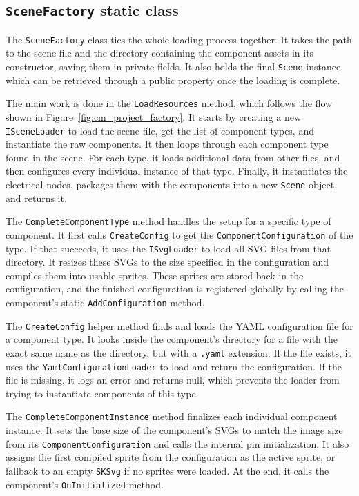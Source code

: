 \subsection{\texttt{SceneFactory} static class}

The \texttt{SceneFactory} class ties the whole loading process together. It takes the path to the scene file and the directory containing the component assets in its constructor, saving them in private fields. It also holds the final \texttt{Scene} instance, which can be retrieved through a public property once the loading is complete.

The main work is done in the \texttt{LoadResources} method, which follows the flow shown in Figure~\ref{fig:cm_project_factory}. It starts by creating a new \texttt{ISceneLoader} to load the scene file, get the list of component types, and instantiate the raw components. It then loops through each component type found in the scene. For each type, it loads additional data from other files, and then configures every individual instance of that type. Finally, it instantiates the electrical nodes, packages them with the components into a new \texttt{Scene} object, and returns it.

The \texttt{CompleteComponentType} method handles the setup for a specific type of component. It first calls \texttt{CreateConfig} to get the \texttt{ComponentConfiguration} of the type. If that succeeds, it uses the \texttt{ISvgLoader} to load all SVG files from that directory. It resizes these SVGs to the size specified in the configuration and compiles them into usable sprites. These sprites are stored back in the configuration, and the finished configuration is registered globally by calling the component's static \texttt{AddConfiguration} method.

The \texttt{CreateConfig} helper method finds and loads the YAML configuration file for a component type. It looks inside the component's directory for a file with the exact same name as the directory, but with a \texttt{.yaml} extension. If the file exists, it uses the \texttt{YamlConfigurationLoader} to load and return the configuration. If the file is missing, it logs an error and returns null, which prevents the loader from trying to instantiate components of this type.

The \texttt{CompleteComponentInstance} method finalizes each individual component instance. It sets the base size of the component's SVGs to match the image size from its \texttt{ComponentConfiguration} and calls the internal pin initialization. It also assigns the first compiled sprite from the configuration as the active sprite, or fallback to an empty \texttt{SKSvg} if no sprites were loaded. At the end, it calls the component's \texttt{OnInitialized} method.

